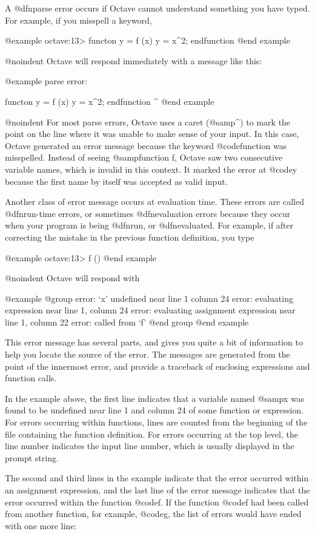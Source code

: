 A @dfn{parse error} occurs if Octave cannot understand something you
have typed.  For example, if you misspell a keyword,

@example
octave:13> functon y = f (x) y = x^2; endfunction
@end example

@noindent
Octave will respond immediately with a message like this:

@example
parse error:

  functon y = f (x) y = x^2; endfunction
          ^
@end example

@noindent
For most parse errors, Octave uses a caret (@samp{^}) to mark the point
on the line where it was unable to make sense of your input.  In this
case, Octave generated an error message because the keyword
@code{function} was misspelled.  Instead of seeing @samp{function f},
Octave saw two consecutive variable names, which is invalid in this
context.  It marked the error at @code{y} because the first name by
itself was accepted as valid input.

Another class of error message occurs at evaluation time.  These
errors are called @dfn{run-time errors}, or sometimes
@dfn{evaluation errors} because they occur when your program is being
@dfn{run}, or @dfn{evaluated}.  For example, if after correcting the
mistake in the previous function definition, you type

@example
octave:13> f ()
@end example

@noindent
Octave will respond with

@example
@group
error: `x' undefined near line 1 column 24
error: evaluating expression near line 1, column 24
error: evaluating assignment expression near line 1, column 22
error: called from `f'
@end group
@end example

This error message has several parts, and gives you quite a bit of
information to help you locate the source of the error.  The messages
are generated from the point of the innermost error, and provide a
traceback of enclosing expressions and function calls.

In the example above, the first line indicates that a variable named
@samp{x} was found to be undefined near line 1 and column 24 of some
function or expression.  For errors occurring within functions, lines
are counted from the beginning of the file containing the function
definition.  For errors occurring at the top level, the line number
indicates the input line number, which is usually displayed in the
prompt string.

The second and third lines in the example indicate that the error
occurred within an assignment expression, and the last line of the error
message indicates that the error occurred within the function @code{f}.
If the function @code{f} had been called from another function, for
example, @code{g}, the list of errors would have ended with one more
line:

